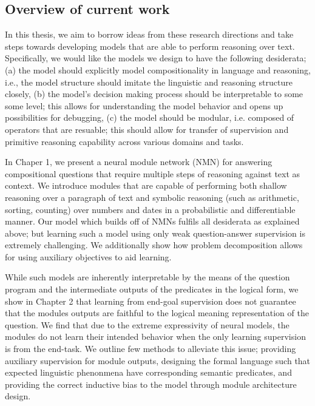 \documentclass[main.tex]{subfiles}
\begin{document}


\subsection{Overview of current work}
In this thesis, we aim to borrow ideas from these research directions and take steps towards developing models that are able to perform reasoning over text.  Specifically, we would like the models we design to have the following desiderata; (a) the model should explicitly model compositionality in language and reasoning, i.e., the model structure should imitate the linguistic and reasoning structure closely, (b) the model's decision making process should be interpretable to some some level; this allows for understanding the model behavior and opens up possibilities for debugging, (c) the model should be modular, i.e. composed of operators that are resuable; this should allow for transfer of supervision and primitive reasoning capability across various domains and tasks.

In Chaper 1, we present a neural module network (NMN) for answering compositional questions that require multiple steps of reasoning against text as context.  We introduce modules that are capable of performing both shallow reasoning over a paragraph of text and symbolic reasoning (such as arithmetic, sorting, counting) over numbers and dates in a probabilistic and differentiable manner.  Our model which builds off of NMNs fulfils all desiderata as explained above; but learning such a model using only weak question-answer supervision is extremely challenging.  We additionally show how problem decomposition allows for using auxiliary objectives to aid learning.

While such models are inherently interpretable by the means of the question program and the intermediate outputs of the predicates in the logical form, we show in Chapter 2 that learning from end-goal supervision does not guarantee that the modules outputs are faithful to the logical meaning representation of the question.  We find that due to the extreme expressivity of neural models, the modules do not learn their intended behavior when the only learning supervision is from the end-task.  We outline few methods to alleviate this issue; providing auxiliary supervision for module outputs, designing the formal language such that expected linguistic phenonmena have corresponding semantic predicates, and providing the correct inductive bias to the model through module architecture design.
\end{document}
